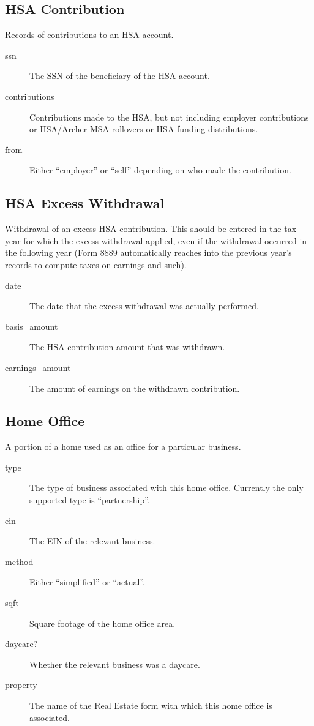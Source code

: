 \subsection{HSA Contribution}

Records of contributions to an HSA account.

\begin{description}
\item[ssn] The SSN of the beneficiary of the HSA account.
\item[contributions] Contributions made to the HSA, but not including employer
contributions or HSA/Archer MSA rollovers or HSA funding distributions.
\item[from] Either ``employer'' or ``self'' depending on who made the
contribution.
\end{description}

\subsection{HSA Excess Withdrawal}

Withdrawal of an excess HSA contribution. This should be entered in the tax year
for which the excess withdrawal applied, even if the withdrawal occurred in the
following year (Form 8889 automatically reaches into the previous year's records
to compute taxes on earnings and such).

\begin{description}
\item[date] The date that the excess withdrawal was actually performed.
\item[basis\_amount] The HSA contribution amount that was withdrawn.
\item[earnings\_amount] The amount of earnings on the withdrawn contribution.
\end{description}

\subsection{Home Office}

A portion of a home used as an office for a particular business.

\begin{description}
\item[type] The type of business associated with this home office. Currently the
only supported type is ``partnership''.
\item[ein] The EIN of the relevant business.
\item[method] Either ``simplified'' or ``actual''.
\item[sqft] Square footage of the home office area.
\item[daycare?] Whether the relevant business was a daycare.
\item[property] The name of the Real Estate form with which this home office is
associated.
\end{description}

